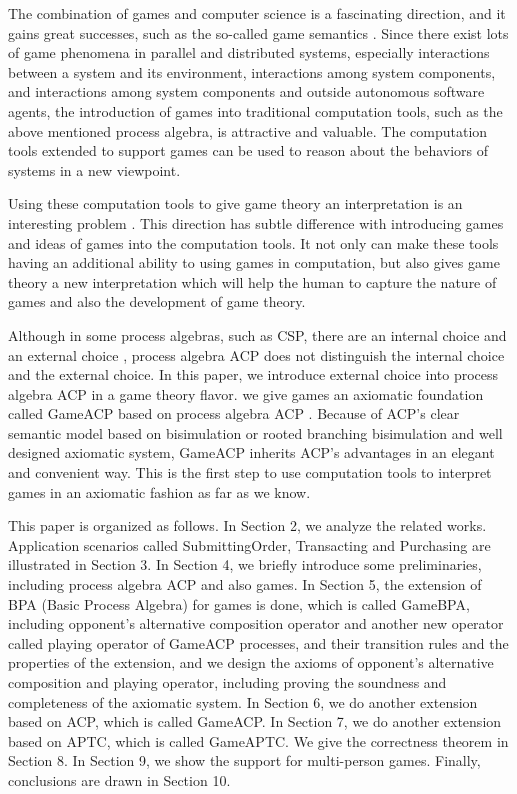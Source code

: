\documentclass{fac}
\begin{document}
The combination of games and computer science is a fascinating direction, and it gains great successes, such as the so-called game semantics \cite{PCF3}. Since there exist lots of game phenomena in parallel and distributed systems, especially interactions between a system and its environment, interactions among system components, and interactions among system components and outside autonomous software agents, the introduction of games into traditional computation tools, such as the above mentioned process algebra, is attractive and valuable. The  computation tools extended to support games can be used to reason about the behaviors of systems in a new viewpoint.

Using these computation tools to give game theory an interpretation is an interesting problem \cite{GameProcess}. This direction has subtle difference with introducing games and ideas of games into the computation tools. It not only can make these tools having an additional ability to using games in computation, but also gives game theory a new interpretation which will help the human to capture the nature of games and also the development of game theory.

Although in some process algebras, such as CSP, there are an internal choice  and an external choice , process algebra ACP does not distinguish the internal choice and the external choice. In this paper, we introduce external choice into process algebra ACP in a game theory flavor. we give games an axiomatic foundation called GameACP based on process algebra ACP \cite{ACP}. Because of ACP's clear semantic model based on bisimulation or rooted branching bisimulation \cite{SOS} and well designed axiomatic system, GameACP inherits ACP's advantages in an elegant and convenient way. This is the first step to use computation tools to interpret games in an axiomatic fashion as far as we know.

This paper is organized as follows. In Section 2, we analyze the related works. Application scenarios called SubmittingOrder, Transacting and Purchasing are illustrated in Section 3. In Section 4, we briefly introduce some preliminaries, including process algebra ACP and also games. In Section 5, the extension of BPA (Basic Process Algebra) for games is done, which is called GameBPA, including opponent's alternative composition operator and another new operator called playing operator of GameACP processes, and their transition rules and the properties of the extension, and we design the axioms of opponent's alternative composition and playing operator, including proving the soundness and completeness of the axiomatic system. In Section 6, we do another extension based on ACP, which is called GameACP. In Section 7, we do another extension based on APTC, which is called GameAPTC. We give the correctness theorem in Section 8. In Section 9, we show the support for multi-person games. Finally, conclusions are drawn in Section 10.
\end{document}
